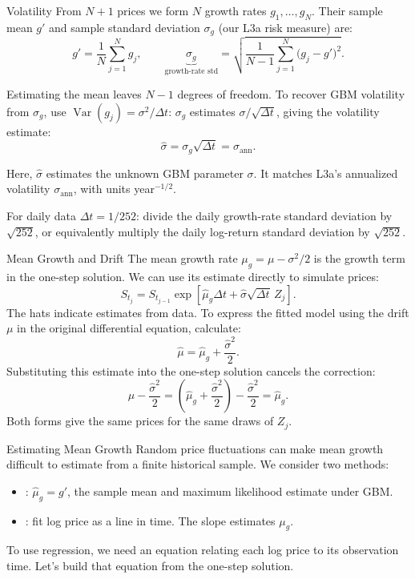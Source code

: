 \documentclass[aspectratio=169,11pt]{beamer}
\newcommand{\Var}{\operatorname{Var}}
\newcommand{\mug}{\mu_g}
\begin{document}
\begin{frame}{Volatility}
  From $N+1$ prices we form $N$ growth rates $g_1,\ldots,g_N$. Their
  sample mean $g'$ and sample standard deviation $\sigma_g$ (our L3a risk
  measure) are:
  \[
    g'=\frac1N\sum_{j=1}^Ng_j,
    \qquad
    \underbrace{\sigma_g}_{\text{growth-rate std}}
    =\sqrt{\frac{1}{N-1}\sum_{j=1}^N\bigl(g_j-g'\bigr)^2}.
  \]

  Estimating the mean leaves $N-1$ degrees of freedom. To recover GBM
  volatility from $\sigma_g$, use $\Var(g_j)=\sigma^2/\Delta t$:
  $\sigma_g$ estimates $\sigma/\sqrt{\Delta t}$, giving the volatility estimate:
  \[
    \boxed{\hat\sigma=\sigma_g\sqrt{\Delta t}=\sigma_{\mathrm{ann}}.}
  \]

  Here, $\hat\sigma$ estimates the unknown GBM parameter $\sigma$. It matches
  L3a's annualized volatility $\sigma_{\mathrm{ann}}$, with units year$^{-1/2}$.

  For daily data $\Delta t=1/252$: divide the daily growth-rate standard
  deviation by $\sqrt{252}$, or equivalently multiply the daily log-return
  standard deviation by $\sqrt{252}$.
\end{frame}

\begin{frame}{Mean Growth and Drift}
  The mean growth rate $\mug=\mu-\sigma^2/2$ is the growth term in the
  one-step solution. We can use its estimate directly to simulate prices:
  \[
    S_{t_j}=S_{t_{j-1}}\exp\!\left[
      \hat{\mu}_g\Delta t+\hat\sigma\sqrt{\Delta t}\,Z_j\right].
  \]
  The hats indicate estimates from data. To express the fitted model using
  the drift $\mu$ in the original differential equation, calculate:
  \[
    \boxed{\hat\mu=\hat{\mu}_g+\frac{\hat\sigma^2}{2}.}
  \]
  Substituting this estimate into the one-step solution cancels the correction:
  \[
    \hat\mu-\frac{\hat\sigma^2}{2}
    =\left(\hat{\mu}_g+\frac{\hat\sigma^2}{2}\right)
      -\frac{\hat\sigma^2}{2}=\hat{\mu}_g.
  \]
  Both forms give the same prices for the same draws of $Z_j$.
\end{frame}

\begin{frame}{Estimating Mean Growth}
  Random price fluctuations can make mean growth difficult to estimate from
  a finite historical sample. We consider two methods:

  \vspace{0.7em}
  \begin{itemize}\setlength{\itemsep}{0.7em}
    \item {}: $\hat{\mu}_g=g'$, the
      sample mean and maximum likelihood estimate under GBM.
    \item {}: fit log price as a line in time.
      The slope estimates $\mug$.
  \end{itemize}

  \vspace{0.7em}
  To use regression, we need an equation relating each log price to its
  observation time. Let's build that equation from the one-step solution.
\end{frame}
\end{document}
